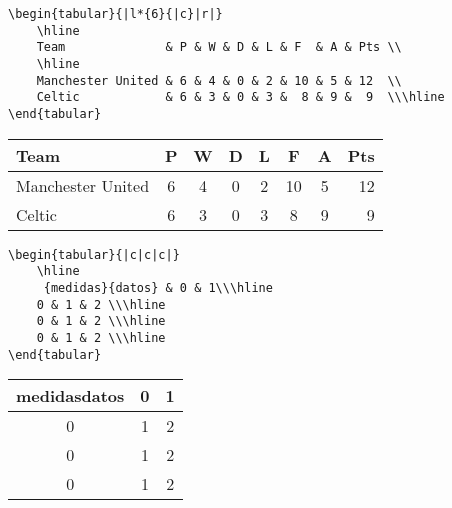 \documentclass[a4,10pt]{aleph-notas}
\begin{document}


\vspace{12pt}

\begin{lstlisting}[frame=single]
\begin{tabular}{|l*{6}{|c}|r|}
    \hline
    Team              & P & W & D & L & F  & A & Pts \\
    \hline
    Manchester United & 6 & 4 & 0 & 2 & 10 & 5 & 12  \\
    Celtic            & 6 & 3 & 0 & 3 &  8 & 9 &  9  \\\hline
\end{tabular}
\end{lstlisting}

\begin{center}
    \begin{tabular}{|l*{6}{|c}|r|}
\hline
Team              & P & W & D & L & F  & A & Pts \\
\hline
Manchester United & 6 & 4 & 0 & 2 & 10 & 5 & 12  \\
Celtic            & 6 & 3 & 0 & 3 &  8 & 9 &  9  \\\hline
\end{tabular}
\end{center}

\vspace{18pt}

\begin{lstlisting}[frame=single]
\begin{tabular}{|c|c|c|}
    \hline
     {medidas}{datos} & 0 & 1\\\hline
    0 & 1 & 2 \\\hline
    0 & 1 & 2 \\\hline
    0 & 1 & 2 \\\hline
\end{tabular}
\end{lstlisting}

\begin{center}
    \begin{tabular}{|c|c|c|}
    \hline
     {medidas}{datos} & 0 & 1\\\hline
    0 & 1 & 2 \\\hline
    0 & 1 & 2 \\\hline
    0 & 1 & 2 \\\hline
\end{tabular}
\end{center}
\end{document}
